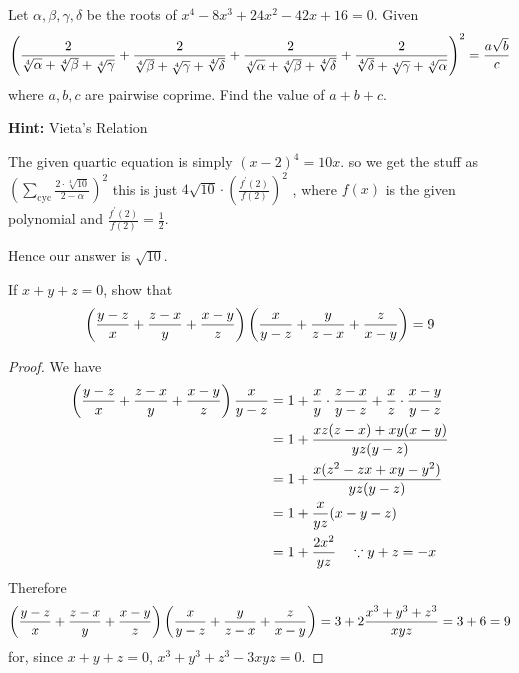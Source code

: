 \begin{prbm}
Let $\alpha,\beta,\gamma,\delta$ be the roots of $x^4-8x^3+24x^2-42x+16=0$. Given
\[ \left(\frac{2}{\sqrt[4]{\alpha}+\sqrt[4]{\beta}+\sqrt[4]{\gamma}}+\frac{2}{\sqrt[4]{\beta}+\sqrt[4]{\gamma}+\sqrt[4]{\delta}}+\frac{2}{\sqrt[4]{\alpha}+\sqrt[4]{\beta}+\sqrt[4]{\delta}}+\frac{2}{\sqrt[4]{\delta}+\sqrt[4]{\gamma}+\sqrt[4]{\alpha}}\right)^2 = \frac{a\sqrt{b}}{c} \]
where $a,b,c$ are pairwise coprime. Find the value of $a+b+c$.

\textbf{Hint:} Vieta's Relation
\end{prbm}
\begin{solution}
The given quartic equation is simply $(x-2)^4=10x$. so we get the stuff as $\left(\sum_{\mathrm{cyc}} \frac{2\cdot \sqrt[4]{10}}{2-\alpha}\right)^2$ this is just $4\sqrt{10} \cdot \left(\frac{f^\prime(2)}{f(2)}\right)^2$ , where $f(x)$ is the given polynomial and $\frac{f^\prime(2)}{f(2)}=\frac{1}{2}$. 

Hence our answer is $\boxed{\sqrt{10}}$.
\end{solution}
\pagebreak

\begin{prbm}[TRIPOS 1878]
If $x+y+z=0$, show that 
\[ \left(\frac{y-z}{x}+\frac{z-x}{y}+\frac{x-y}{z}\right) \left(\frac{x}{y-z}+\frac{y}{z-x}+\frac{z}{x-y}\right) = 9 \]
\end{prbm}

\begin{proof}
We have 
\begin{align*}
\left(\frac{y-z}{x}+\frac{z-x}{y}+\frac{x-y}{z}\right)\frac{x}{y-z}
&= 1 + \frac{x}{y}\cdot\frac{z-x}{y-z} + \frac{x}{z}\cdot\frac{x-y}{y-z} \\
&= 1 + \frac{xz(z-x)+xy(x-y)}{yz(y-z)} \\
&= 1 + \frac{x(z^2-zx+xy-y^2)}{yz(y-z)} \\
&= 1 + \frac{x}{yz}(x-y-z) \\
&= 1 + \frac{2x^2}{yz} \quad \because y+z=-x
\end{align*}
Therefore
\[ \left(\frac{y-z}{x}+\frac{z-x}{y}+\frac{x-y}{z}\right) \left(\frac{x}{y-z}+\frac{y}{z-x}+\frac{z}{x-y}\right) = 3+2\frac{x^3+y^3+z^3}{xyz}=3+6=9 \]
for, since $x+y+z=0$, $x^3+y^3+z^3-3xyz=0$.
\end{proof}
\pagebreak

